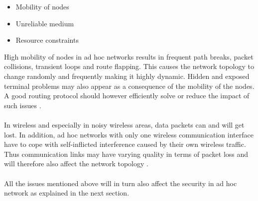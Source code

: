 \begin{itemize}
\item Mobility of nodes
\item Unreliable medium
\item Resource constraints
\end{itemize}

\noindent
High mobility of nodes in ad hoc networks results in frequent path breaks, packet collisions, transient loops and route flapping. This causes the network topology to change randomly and frequently making it highly dynamic. Hidden and exposed terminal problems may also appear as a consequence of the mobility of the nodes. A good routing protocol should however efficiently solve or reduce the impact of such issues \cite{murthy-ad}.
\\\\
In wireless and especially in noisy wireless areas, data packets can and will get lost. In addition, ad hoc networks with only one wireless communication interface have to cope with self-inflicted interference caused by their own wireless traffic. Thus communication links may have varying quality in terms of packet loss and will therefore also affect the network topology \cite{batman_rfc}.
\\\\
All the issues mentioned above will in turn also affect the security in ad hoc network as explained in the next section.

